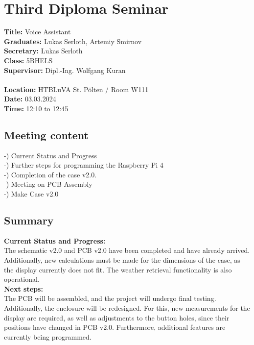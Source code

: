 
\section{Third Diploma Seminar}
\textbf{Title:} Voice Assistant\\

\noindent\textbf{Graduates:} Lukas Serloth, Artemiy Smirnov\\

\noindent\textbf{Secretary:} Lukas Serloth\\

\noindent\textbf{Class:} 5BHELS\\

\noindent\textbf{Supervisor:} Dipl.-Ing. Wolfgang Kuran\\ \\

\noindent\textbf{Location:} HTBLuVA St. Pölten / Room W111\\

\noindent\textbf{Date:} 03.03.2024\\

\noindent\textbf{Time:} 12:10 to 12:45\\ 

\subsection{Meeting content}
-) Current Status and Progress \\ -) Further steps for programming the Raspberry Pi 4 \\ -) Completion of the case v2.0. \\ -) Meeting on PCB Assembly \\ -) Make Case v2.0

\subsection{Summary}
\textbf{Current Status and Progress:\\} 
The schematic v2.0 and PCB v2.0 have been completed and have already arrived. Additionally, new calculations must be made for the dimensions of the case, as the display currently does not fit. The weather retrieval functionality is also operational.\\

\noindent\textbf{Next steps:\\}
The PCB will be assembled, and the project will undergo final testing. Additionally, the enclosure will be redesigned. For this, new measurements for the display are required, as well as adjustments to the button holes, since their positions have changed in PCB v2.0.
Furthermore, additional features are currently being programmed.
